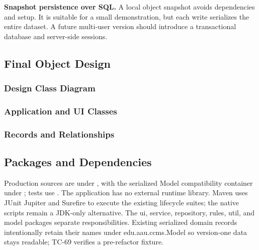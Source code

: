 \documentclass[12pt]{article}
\begin{document}
\textbf{Snapshot persistence over SQL.} A local object snapshot avoids dependencies and setup. It is suitable for a small demonstration, but each write serializes the entire dataset. A future multi-user version should introduce a transactional database and server-side sessions.
\begin{umlpage}
\subsection{Final Object Design}
\clearpage\subsubsection*{Design Class Diagram}
\clearpage\subsubsection*{Application and UI Classes}
\clearpage\subsubsection*{Records and Relationships}
\end{umlpage}
\begin{umlpage}
\subsection{Packages and Dependencies}
\end{umlpage}
Production sources are under , with the serialized Model compatibility container under ; tests use . The application has no external runtime library. Maven uses JUnit Jupiter and Surefire to execute the existing lifecycle suites; the native scripts remain a JDK-only alternative. The ui, service, repository, rules, util, and model packages separate responsibilities. Existing serialized domain records intentionally retain their names under edu.aau.ccms.Model so version-one data stays readable; TC-69 verifies a pre-refactor fixture.
\end{document}
